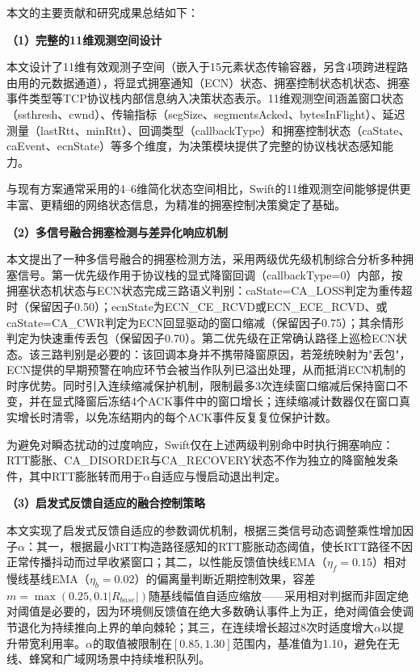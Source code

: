 本文的主要贡献和研究成果总结如下：

\textbf{（1）完整的11维观测空间设计}

本文设计了11维有效观测子空间（嵌入于15元素状态传输容器，另含4项跨进程路由用的元数据通道），将显式拥塞通知（ECN）状态、拥塞控制状态机状态、拥塞事件类型等TCP协议栈内部信息纳入决策状态表示。11维观测空间涵盖窗口状态（ssthresh、cwnd）、传输指标（segSize、segmentsAcked、bytesInFlight）、延迟测量（lastRtt、minRtt）、回调类型（callbackType）和拥塞控制状态（caState、caEvent、ecnState）等多个维度，为决策模块提供了完整的协议栈状态感知能力。

与现有方案通常采用的4--6维简化状态空间相比，Swift的11维观测空间能够提供更丰富、更精细的网络状态信息，为精准的拥塞控制决策奠定了基础。

\textbf{（2）多信号融合拥塞检测与差异化响应机制}

本文提出了一种多信号融合的拥塞检测方法，采用两级优先级机制综合分析多种拥塞信号。第一优先级作用于协议栈的显式降窗回调（callbackType=0）内部，按拥塞状态机状态与ECN状态完成三路语义判别：caState=CA\_LOSS判定为重传超时（保留因子0.50）；ecnState为ECN\_CE\_RCVD或ECN\_ECE\_RCVD、或caState=CA\_CWR判定为ECN回显驱动的窗口缩减（保留因子0.75）；其余情形判定为快速重传丢包（保留因子0.70）。第二优先级在正常确认路径上巡检ECN状态。该三路判别是必要的：该回调本身并不携带降窗原因，若笼统映射为"丢包"，ECN提供的早期预警在响应环节会被当作队列已溢出处理，从而抵消ECN机制的时序优势。同时引入连续缩减保护机制，限制最多3次连续窗口缩减后保持窗口不变，并在显式降窗后冻结4个ACK事件中的窗口增长；连续缩减计数器仅在窗口真实增长时清零，以免冻结期内的每个ACK事件反复复位保护计数。

为避免对瞬态扰动的过度响应，Swift仅在上述两级判别命中时执行拥塞响应：RTT膨胀、CA\_DISORDER与CA\_RECOVERY状态不作为独立的降窗触发条件，其中RTT膨胀转而用于$\alpha$自适应与慢启动退出判定。

\textbf{（3）启发式反馈自适应的融合控制策略}

本文实现了启发式反馈自适应的参数调优机制，根据三类信号动态调整乘性增加因子$\alpha$：其一，根据最小RTT构造路径感知的RTT膨胀动态阈值，使长RTT路径不因正常传播抖动而过早收紧窗口；其二，以性能反馈值快线EMA（$\eta_f=0.15$）相对慢线基线EMA（$\eta_b=0.02$）的偏离量判断近期控制效果，容差$m=\max(0.25, 0.1|R_{base}|)$随基线幅值自适应缩放——采用相对判据而非固定绝对阈值是必要的，因为环境侧反馈值在绝大多数确认事件上为正，绝对阈值会使调节退化为持续推向上界的单向棘轮；其三，在连续增长超过8次时适度增大$\alpha$以提升带宽利用率。$\alpha$的取值被限制在$[0.85, 1.30]$范围内，基准值为1.10，避免在无线、蜂窝和广域网场景中持续堆积队列。

